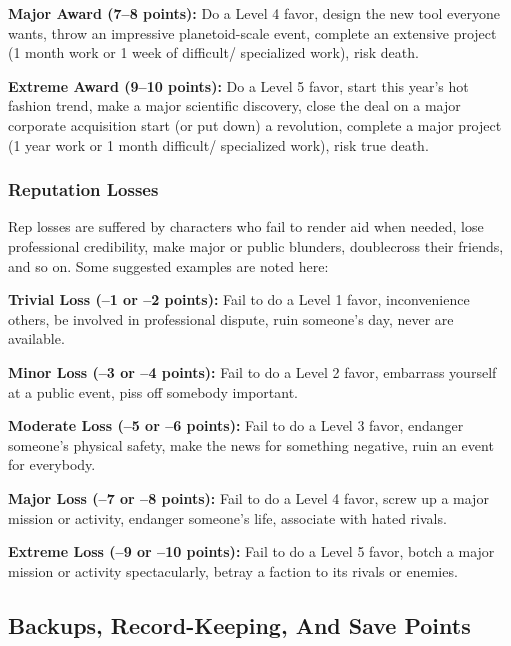 \textbf{Major Award (7–8 points):} Do a Level 4 favor, 
design the new tool everyone wants, throw an 
impressive planetoid-scale event, complete an extensive
project (1 month work or 1 week of difficult/
specialized work), risk death.

\textbf{Extreme Award (9–10 points):} Do a Level 5 favor, 
start this year's hot fashion trend, make a major scientific
discovery, close the deal on a major corporate acquisition
start (or put down) a revolution, complete
a major project (1 year work or 1 month difficult/
specialized work), risk true death.

\subsubsection{Reputation Losses}

Rep losses are suffered by characters who fail to render 
aid when needed, lose professional credibility, make 
major or public blunders, doublecross their friends, 
and so on. Some suggested examples are noted here:

\textbf{Trivial Loss (–1 or –2 points):} Fail to do a Level 1 
favor, inconvenience others, be involved in professional
dispute, ruin someone's day, never are available.

\textbf{Minor Loss (–3 or –4 points):} Fail to do a Level 2 
favor, embarrass yourself at a public event, piss off 
somebody important.

\textbf{Moderate Loss (–5 or –6 points):} Fail to do a Level 
3 favor, endanger someone's physical safety, make 
the news for something negative, ruin an event for 
everybody.

\textbf{Major Loss (–7 or –8 points):} Fail to do a Level 4 
favor, screw up a major mission or activity, endanger 
someone's life, associate with hated rivals.

\textbf{Extreme Loss (–9 or –10 points):} Fail to do a Level 
5 favor, botch a major mission or activity spectacularly, 
betray a faction to its rivals or enemies.

\subsection{Backups, Record-Keeping, And Save Points}

